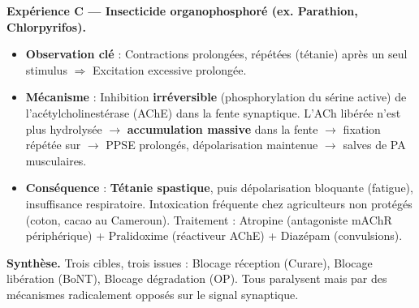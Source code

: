 \documentclass[11pt]{article}
\newcommand{\cle}[1]{{\popxbold\color{popdark}#1}}
\begin{document}
\begin{exoresolu}
\textbf{Expérience C — Insecticide organophosphoré (ex. Parathion, Chlorpyrifos).}
\begin{itemize}
\item \textbf{Observation clé} : Contractions prolongées, répétées (tétanie) après un seul stimulus $\Rightarrow$ Excitation excessive prolongée.
\item \textbf{Mécanisme} : Inhibition \textbf{irréversible} (phosphorylation du sérine active) de l'\cle{acétylcholinestérase (AChE)} dans la fente synaptique. L'ACh libérée n'est plus hydrolysée $\rightarrow$ \textbf{accumulation massive} dans la fente $\rightarrow$ fixation répétée sur  $\rightarrow$ PPSE prolongés, dépolarisation maintenue $\rightarrow$ salves de PA musculaires.
\item \textbf{Conséquence} : \textbf{Tétanie spastique}, puis dépolarisation bloquante (fatigue), insuffisance respiratoire. Intoxication fréquente chez agriculteurs non protégés (coton, cacao au Cameroun). Traitement : Atropine (antagoniste mAChR périphérique) + Pralidoxime (réactiveur AChE) + Diazépam (convulsions).
\end{itemize}
\textbf{Synthèse.} Trois cibles, trois issues : Blocage réception (Curare), Blocage libération (BoNT), Blocage dégradation (OP). Tous paralysent mais par des mécanismes radicalement opposés sur le signal synaptique.
\end{exoresolu}
\end{document}
